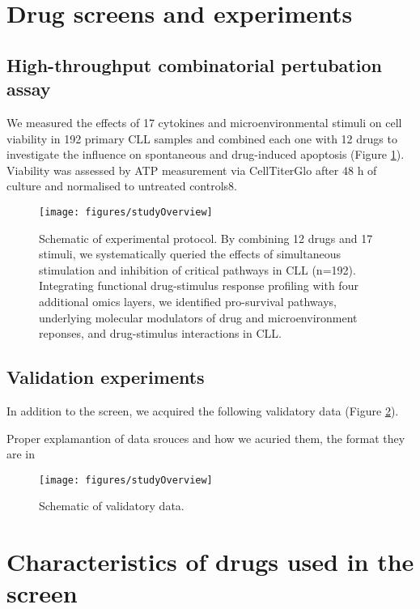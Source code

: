 \documentclass[11pt, a4paper, twosided]{book}
\begin{document}
\hypertarget{drug-screens-and-experiments}{%
\section{Drug screens and experiments}\label{drug-screens-and-experiments}}

\hypertarget{high-throughput-combinatorial-pertubation-assay}{%
\subsection{High-throughput combinatorial pertubation assay}\label{high-throughput-combinatorial-pertubation-assay}}

We measured the effects of 17 cytokines and microenvironmental stimuli on cell viability in 192 primary CLL samples and combined each one with 12 drugs to investigate the influence on spontaneous and drug-induced apoptosis (Figure \ref{fig:studyOverview}). Viability was assessed by ATP measurement via CellTiterGlo after 48 h of culture and normalised to untreated controls8.


\begin{figure}

{\centering \texttt{[image: figures/studyOverview]} 

}

\caption{Schematic of experimental protocol. By combining 12 drugs and 17 stimuli, we systematically queried the effects of simultaneous stimulation and inhibition of critical pathways in CLL (n=192). Integrating functional drug-stimulus response profiling with four additional omics layers, we identified pro-survival pathways, underlying molecular modulators of drug and microenvironment reponses, and drug-stimulus interactions in CLL.}\label{fig:studyOverview}
\end{figure}
\hypertarget{validation-experiments}{%
\subsection{Validation experiments}\label{validation-experiments}}

In addition to the screen, we acquired the following validatory data (Figure \ref{fig:additionalData}).

Proper explamantion of data srouces and how we acuried them, the format they are in


\begin{figure}

{\centering \texttt{[image: figures/studyOverview]} 

}

\caption{Schematic of validatory data.}\label{fig:additionalData}
\end{figure}
\hypertarget{characteristics-of-drugs-used-in-the-screen}{%
\section{Characteristics of drugs used in the screen}\label{characteristics-of-drugs-used-in-the-screen}}
\end{document}
